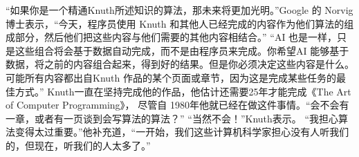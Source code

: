 \documentclass[12pt]{ctexart}
\begin{document}
\begin{multicols}{2}
“如果你是一个精通Knuth所述知识的算法，那未来将更加光明。”Google 的 Norvig 博士表示，“今天，程序员使用 Knuth
和其他人已经完成的内容作为他们算法的组成部分，然后他们把这些内容与他们需要的其他内容相结合。” “AI
也是一样，只是这些组合将会基于数据自动完成，而不是由程序员来完成。你希望AI
能够基于数据，将之前的内容组合起来，得到好的结果。但是你必须决定这些内容是什么。
可能所有内容都出自Knuth 作品的某个页面或章节，因为这是完成某些任务的最佳方式。”
Knuth一直在坚持完成他的作品，他估计还需要25年才能完成《The Art of Computer Programming》，
尽管自 1980年他就已经在做这件事情。“会不会有一章，或者有一页谈到会写算法的算法？”
“当然不会！”Knuth表示。
“我担心算法变得太过重要。”他补充道，“一开始，我们这些计算机科学家担心没有人听我们的，但现在，听我们的人太多了。” 
\end{multicols}

    
\end{document}
